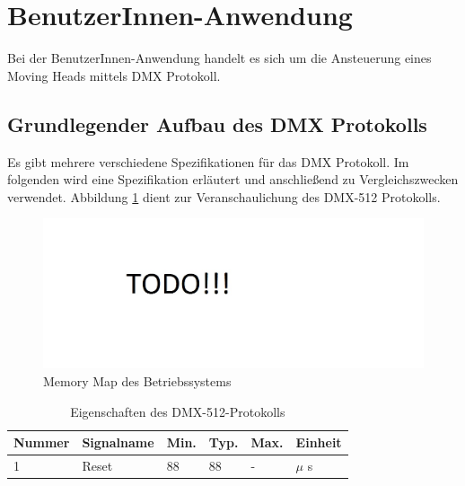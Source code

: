 \section{BenutzerInnen-Anwendung}

Bei der BenutzerInnen-Anwendung handelt es sich um die Ansteuerung eines Moving Heads mittels DMX Protokoll.  

\subsection{Grundlegender Aufbau des DMX Protokolls}
Es gibt mehrere verschiedene Spezifikationen für das DMX Protokoll. Im folgenden wird eine Spezifikation erläutert und anschließend zu Vergleichszwecken verwendet. Abbildung \ref{fig:DMX-512-Protocol} dient zur Veranschaulichung des DMX-512 Protokolls. 

\begin{figure}[H]
	\includegraphics[scale=0.60]{chapters/userapplication/figures/todo}
	\caption{Memory Map des Betriebssystems}
	\label{fig:DMX-512-Protocol}
\end{figure}

\begin{table}[H]
\begin{tabular}{ l | l | l | l | l | l }
  \textbf{Nummer} & \textbf{Signalname} & \textbf{Min.} & \textbf{Typ.} & \textbf{Max.} & \textbf{Einheit} \\ 
  \hline
  1 & Reset & 88 & 88 & - & $\mu$ s \\
 \end{tabular}
 \caption{Eigenschaften des DMX-512-Protokolls}
 \label{table:DMX-512-Protocol}
\end{table}


\pagebreak 